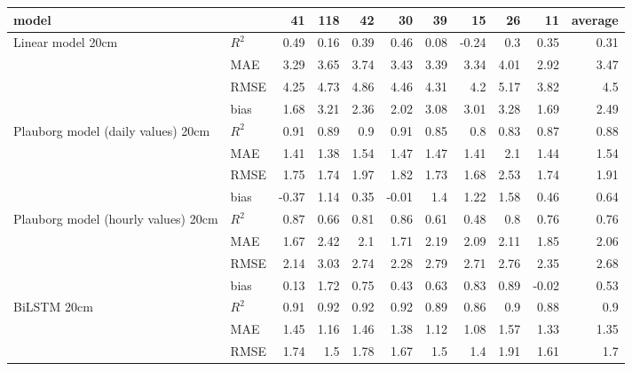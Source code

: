 \begin{tabular}{llrrrrrrrrr}
\hline
 model                               &       &    41 &   118 &    42 &    30 &   39 &    15 &   26 &    11 &   average \\
\hline
 Linear model 20cm                   & $R^2$ &  0.49 &  0.16 &  0.39 &  0.46 & 0.08 & -0.24 & 0.3  &  0.35 &      0.31 \\
                                     & MAE   &  3.29 &  3.65 &  3.74 &  3.43 & 3.39 &  3.34 & 4.01 &  2.92 &      3.47 \\
                                     & RMSE  &  4.25 &  4.73 &  4.86 &  4.46 & 4.31 &  4.2  & 5.17 &  3.82 &      4.5  \\
                                     & bias  &  1.68 &  3.21 &  2.36 &  2.02 & 3.08 &  3.01 & 3.28 &  1.69 &      2.49 \\
 Plauborg model (daily values) 20cm  & $R^2$ &  0.91 &  0.89 &  0.9  &  0.91 & 0.85 &  0.8  & 0.83 &  0.87 &      0.88 \\
                                     & MAE   &  1.41 &  1.38 &  1.54 &  1.47 & 1.47 &  1.41 & 2.1  &  1.44 &      1.54 \\
                                     & RMSE  &  1.75 &  1.74 &  1.97 &  1.82 & 1.73 &  1.68 & 2.53 &  1.74 &      1.91 \\
                                     & bias  & -0.37 &  1.14 &  0.35 & -0.01 & 1.4  &  1.22 & 1.58 &  0.46 &      0.64 \\
 Plauborg model (hourly values) 20cm & $R^2$ &  0.87 &  0.66 &  0.81 &  0.86 & 0.61 &  0.48 & 0.8  &  0.76 &      0.76 \\
                                     & MAE   &  1.67 &  2.42 &  2.1  &  1.71 & 2.19 &  2.09 & 2.11 &  1.85 &      2.06 \\
                                     & RMSE  &  2.14 &  3.03 &  2.74 &  2.28 & 2.79 &  2.71 & 2.76 &  2.35 &      2.68 \\
                                     & bias  &  0.13 &  1.72 &  0.75 &  0.43 & 0.63 &  0.83 & 0.89 & -0.02 &      0.53 \\
 BiLSTM 20cm                         & $R^2$ &  0.91 &  0.92 &  0.92 &  0.92 & 0.89 &  0.86 & 0.9  &  0.88 &      0.9  \\
                                     & MAE   &  1.45 &  1.16 &  1.46 &  1.38 & 1.12 &  1.08 & 1.57 &  1.33 &      1.35 \\
                                     & RMSE  &  1.74 &  1.5  &  1.78 &  1.67 & 1.5  &  1.4  & 1.91 &  1.61 &      1.7  \\

\end{tabular}
